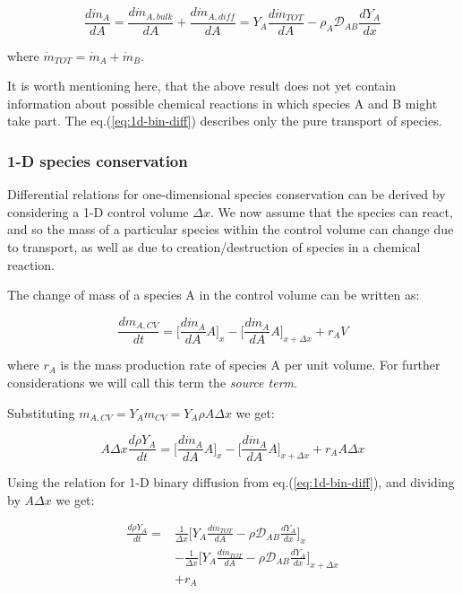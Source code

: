 \documentclass[10pt,twocolumn]{article}
\begin{document}
\begin{equation}
\frac{d \dot{m}_A }{dA} = \frac{d \dot{m}_{A, bulk}}{dA} + \frac{d \dot{m}_{A, diff}}{dA} = Y_A \frac{d \dot{m}_{TOT}}{d A} - \rho_A \mathcal{D}_{AB} \frac{dY_A}{dx}
\end{equation}\label{eq:1d-bin-diff}

where $\dot{m}_{TOT} = \dot{m}_A + \dot{m}_B$.

It is worth mentioning here, that the above result does not yet contain information about possible chemical reactions in which species A and B might take part. The eq.(\ref{eq:1d-bin-diff}) describes only the pure transport of species.

\subsubsection{1-D species conservation}

Differential relations for one-dimensional species conservation can be derived by considering a 1-D control volume $\Delta x$. We now assume that the species can react, and so the mass of a particular species within the control volume can change due to transport, as well as due to creation/destruction of species in a chemical reaction. 

The change of mass of a species A in the control volume can be written as:

\begin{equation}
\frac{d m_{A, CV} }{dt} = \Big[ \frac{d \dot{m}_A}{d A} A \Big]_x - \Big[ \frac{d \dot{m}_A}{d A} A \Big]_{x + \Delta x} + r_A V
\end{equation}

where $r_A$ is the mass production rate of species A per unit volume. For further considerations we will call this term the \textit{source term}.

Substituting $m_{A, CV} = Y_A m_{CV} = Y_A \rho A \Delta x$ we get:

\begin{equation}
A \Delta x \frac{d \rho Y_{A} }{dt} = \Big[ \frac{d \dot{m}_A}{d A} A \Big]_x - \Big[ \frac{d \dot{m}_A}{d A} A \Big]_{x + \Delta x} + r_A A \Delta x
\end{equation}

Using the relation for 1-D binary diffusion from eq.(\ref{eq:1d-bin-diff}), and dividing by $A \Delta x$ we get:

\begin{equation}
\begin{aligned}
\frac{d \rho Y_{A} }{dt} = & \frac{1}{\Delta x}\Big[ Y_A \frac{d \dot{m}_{TOT}}{d A} - \rho \mathcal{D}_{AB} \frac{dY_A}{dx} \Big]_x \\
& - \frac{1}{\Delta x} \Big[ Y_A \frac{d \dot{m}_{TOT}}{d A} - \rho \mathcal{D}_{AB} \frac{dY_A}{dx} \Big]_{x + \Delta x} \\
& + r_A
\end{aligned}
\end{equation}
\end{document}
